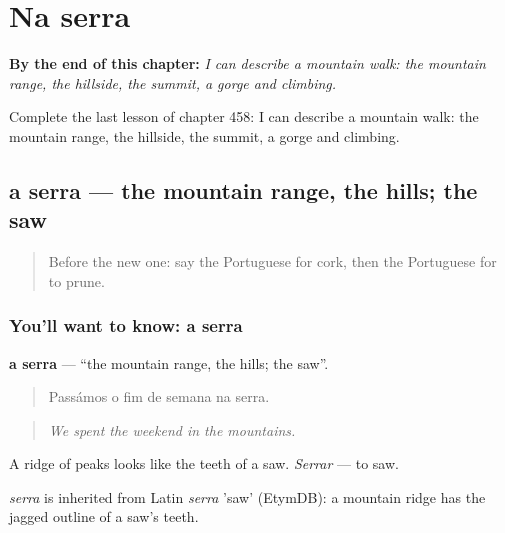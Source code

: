 
\chapter{Na serra}
\label{ch:pt-na-serra}

\begin{chapteropening}
\textbf{By the end of this chapter:} \emph{I can describe a mountain walk: the mountain range, the hillside, the summit, a gorge and climbing.}

Complete the last lesson of chapter 458: I can describe a mountain walk: the mountain range, the hillside, the summit, a gorge and climbing.
\end{chapteropening}

\section[a serra]{a serra — the mountain range, the hills; the saw}

\label{lesson:PT-C458-serra}



\begin{quote}
Before the new one: say the Portuguese for cork, then the Portuguese for to prune.
\end{quote}

\subsection*{You'll want to know: a serra}
\textbf{a serra} — \textquotedblleft{}the mountain range, the hills; the saw\textquotedblright{}.

\begin{quote}
Passámos o fim de semana na serra.
\end{quote}

\begin{quote}
\emph{We spent the weekend in the mountains.}
\end{quote}

A ridge of peaks looks like the teeth of a saw. \emph{Serrar} — to saw.

\begin{cousinweb}
\emph{serra} is inherited from Latin \emph{serra} 'saw' (EtymDB): a mountain ridge has the jagged outline of a saw's teeth.
\end{cousinweb}

